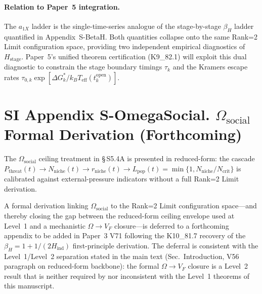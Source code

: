 \documentclass[11pt]{article}
\begin{document}
\paragraph{Relation to Paper~5 integration.} The $a_{1X}$ ladder is the single-time-series analogue of the stage-by-stage $\beta_H$ ladder quantified in Appendix~S-BetaH.  Both quantities collapse onto the same Rank=2 Limit configuration space, providing two independent empirical diagnostics of $H_{\mathrm{stage}}$.  Paper~5's unified theorem certification (K9\_82.1) will exploit this dual diagnostic to constrain the stage boundary timings $\tau_k$ and the Kramers escape rates $\tau_{0,k}\exp[\Delta G^*_k/k_B T_{\mathrm{eff}}(t_k^{\mathrm{open}})]$.

\section*{SI Appendix S-OmegaSocial. $\Omega_{\mathrm{social}}$ Formal Derivation (Forthcoming)}

The $\Omega_{\mathrm{social}}$ ceiling treatment in \S\,S5.4A is presented in reduced-form: the cascade $P_{\mathrm{threat}}(t)\to N_{\mathrm{niche}}(t)\to r_{\mathrm{niche}}(t)\to L_{\mathrm{pop}}(t)=\min\{1,N_{\mathrm{niche}}/N_{\mathrm{crit}}\}$ is calibrated against external-pressure indicators without a full Rank=2 Limit derivation.

A formal derivation linking $\Omega_{\mathrm{social}}$ to the Rank=2 Limit configuration space---and thereby closing the gap between the reduced-form ceiling envelope used at Level~1 and a mechanistic $\Omega\to V_F$ closure---is deferred to a forthcoming appendix to be added in Paper~3 V71 following the K10\_81.7 recovery of the $\beta_H=1+1/(2H_{\mathrm{ind}})$ first-principle derivation.  The deferral is consistent with the Level~1/Level~2 separation stated in the main text (Sec.~Introduction, V56 paragraph on reduced-form backbone): the formal $\Omega\to V_F$ closure is a Level~2 result that is neither required by nor inconsistent with the Level~1 theorems of this manuscript.


\end{document}
